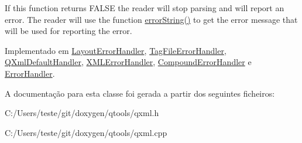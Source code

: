 If this function returns F\-A\-L\-S\-E the reader will stop parsing and will report an error. The reader will use the function \hyperlink{class_q_xml_error_handler_ac86bbbabef3a52aec7615cbbc0adb3f4}{error\-String()} to get the error message that will be used for reporting the error. 

Implementado em \hyperlink{class_layout_error_handler_aed90bd0b5272f7a5042451fa8f20c5ba}{Layout\-Error\-Handler}, \hyperlink{class_tag_file_error_handler_aac28fc998851e69a512e4f544eeff5a7}{Tag\-File\-Error\-Handler}, \hyperlink{class_q_xml_default_handler_aed90bd0b5272f7a5042451fa8f20c5ba}{Q\-Xml\-Default\-Handler}, \hyperlink{class_x_m_l_error_handler_aac28fc998851e69a512e4f544eeff5a7}{X\-M\-L\-Error\-Handler}, \hyperlink{class_compound_error_handler_aac28fc998851e69a512e4f544eeff5a7}{Compound\-Error\-Handler} e \hyperlink{class_error_handler_aac28fc998851e69a512e4f544eeff5a7}{Error\-Handler}.



A documentação para esta classe foi gerada a partir dos seguintes ficheiros\-:\begin{DoxyCompactItemize}
\item 
C\-:/\-Users/teste/git/doxygen/qtools/qxml.\-h\item 
C\-:/\-Users/teste/git/doxygen/qtools/qxml.\-cpp\end{DoxyCompactItemize}
